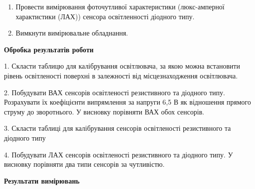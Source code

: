 \documentclass[a4paper,14pt]{extreport}
\begin{document}
\begin{enumerate}
\item Провести вимірювання фоточутливої характеристики (люкс-амперної характистики (ЛАХ)) сенсора освітленності діодного типу.


\item Вимкнути вимірювальне обладнання.

\end{enumerate}
\begin{center}
\textbf{Обробка результатів роботи}
\end{center}

\begin{trivlist}
\item 1. Скласти таблицю для калібрування освітлювача, за якою можна встановити
рівень освітленості поверхні в залежності від місцезнаходження
освітлювача.
\item 2. Побудувати ВАХ сенсорів освітленості резистивного та діодного типу.
Розрахувати їх коефіцієнти випрямлення за напруги 6,5 В як відношення
прямого струму до зворотнього. У висновку порівняти ВАХ обох сенсорів.
\item 3. Скласти таблиці для калібрування сенсорів освітленості резистивного та
діодного типу
\item 4. Побудувати ЛАХ сенсорів освітленості резистивного та діодного типу. У
висновку порівняти два типи сенсорів за чутливістю.
\end{trivlist}
\newpage

\begin{center}
\textbf{Результати вимірювань}
\end{center}
\end{document}
